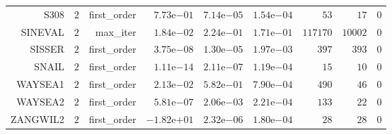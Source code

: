\begin{longtable}{rrrrrrrrr}
S308 & \(     2\) & first\_order & \( 7.73\)e\(-01\) & \( 7.14\)e\(-05\) & \( 1.54\)e\(-04\) & \(    53\) & \(    17\) & \(     0\) \\
SINEVAL & \(     2\) & max\_iter & \( 1.84\)e\(-02\) & \( 2.24\)e\(-01\) & \( 1.71\)e\(-01\) & \(117170\) & \( 10002\) & \(     0\) \\
SISSER & \(     2\) & first\_order & \( 3.75\)e\(-08\) & \( 1.30\)e\(-05\) & \( 1.97\)e\(-03\) & \(   397\) & \(   393\) & \(     0\) \\
SNAIL & \(     2\) & first\_order & \( 1.11\)e\(-14\) & \( 2.11\)e\(-07\) & \( 1.19\)e\(-04\) & \(    15\) & \(    10\) & \(     0\) \\
WAYSEA1 & \(     2\) & first\_order & \( 2.13\)e\(-02\) & \( 5.82\)e\(-01\) & \( 7.90\)e\(-04\) & \(   490\) & \(    46\) & \(     0\) \\
WAYSEA2 & \(     2\) & first\_order & \( 5.81\)e\(-07\) & \( 2.06\)e\(-03\) & \( 2.21\)e\(-04\) & \(   133\) & \(    22\) & \(     0\) \\
ZANGWIL2 & \(     2\) & first\_order & \(-1.82\)e\(+01\) & \( 2.32\)e\(-06\) & \( 1.80\)e\(-04\) & \(    28\) & \(    28\) & \(     0\) \\\hline
\end{longtable}
